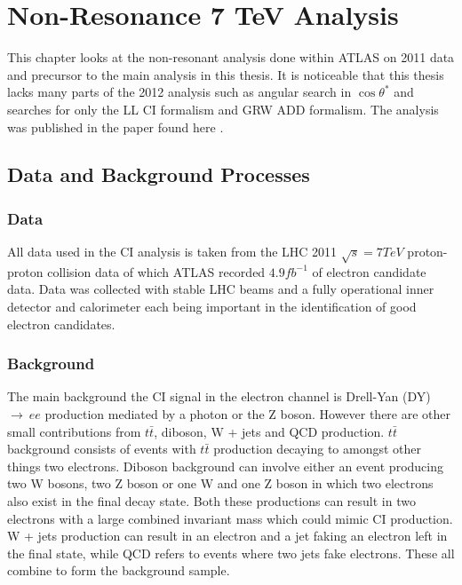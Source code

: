 \chapter{Non-Resonance 7 TeV Analysis}

This chapter looks at the non-resonant analysis done within ATLAS on 2011 data and precursor to the main analysis in this thesis. It is noticeable that this thesis lacks many parts of the 2012 analysis such as angular search in $\cos{\theta^{*}}$ and searches for only the LL CI formalism and GRW ADD formalism. The analysis was published in the paper found here \cite{PhysRevD.87.015010}. 




\section{Data and Background Processes}

\subsection{Data}
	All data used in the CI analysis is taken from the LHC 2011 $\sqrt{s} = 7 TeV$ proton-proton collision data  of which ATLAS recorded $4.9 fb^{-1}$ of electron candidate data. Data was collected with stable LHC beams and a fully operational inner detector and calorimeter each being important in the identification of good electron candidates.

\subsection{Background}
	The main background the CI signal in the electron channel is Drell-Yan (DY) $\rightarrow~ee$ production mediated by a photon or the Z boson. However there are other small contributions from $t\bar{t}$, diboson, W + jets and QCD production. $t\bar{t}$ background consists of events with $t\bar{t}$ production decaying to amongst other things two electrons. Diboson background can involve either an event producing two W bosons, two Z boson or one W and one Z boson in which two electrons also exist in the final decay state. Both these productions can result in two electrons with a large combined invariant mass which could mimic CI production. W + jets production can result in an electron and a jet faking an electron left in the final state, while QCD refers to events where two jets fake electrons. These all combine to form the background sample.

